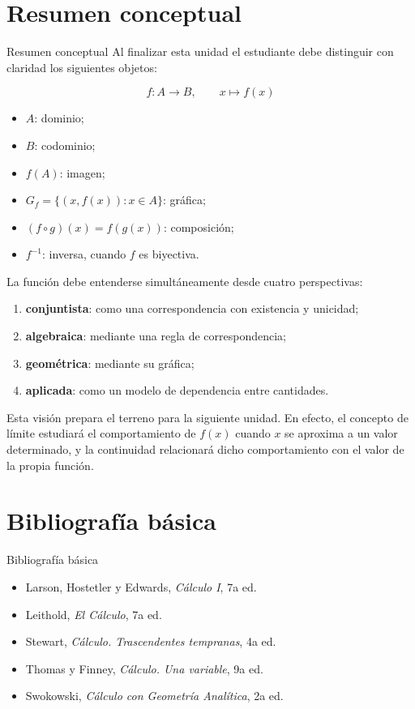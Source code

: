 \documentclass[aspectratio=169,10pt]{beamer}
\begin{document}
\section{Resumen conceptual}
\begin{frame}{Resumen conceptual}
Al finalizar esta unidad el estudiante debe distinguir con claridad los
siguientes objetos:

\[
\boxed{
f:A\to B,\qquad x\mapsto f(x)
}
\]

\begin{itemize}
    \item $A$: dominio;
    \item $B$: codominio;
    \item $f(A)$: imagen;
    \item $G_f=\{(x,f(x)):x\in A\}$: gráfica;
    \item $(f\circ g)(x)=f(g(x))$: composición;
    \item $f^{-1}$: inversa, cuando $f$ es biyectiva.
\end{itemize}

La función debe entenderse simultáneamente desde cuatro perspectivas:
\begin{enumerate}
    \item \textbf{conjuntista}: como una correspondencia con existencia y
    unicidad;
    \item \textbf{algebraica}: mediante una regla de correspondencia;
    \item \textbf{geométrica}: mediante su gráfica;
    \item \textbf{aplicada}: como un modelo de dependencia entre cantidades.
\end{enumerate}

Esta visión prepara el terreno para la siguiente unidad. En efecto, el concepto
de límite estudiará el comportamiento de $f(x)$ cuando $x$ se aproxima a un
valor determinado, y la continuidad relacionará dicho comportamiento con el
valor de la propia función.

\end{frame}
\section{Bibliografía básica}
\begin{frame}{Bibliografía básica}
\begin{itemize}
    \item Larson, Hostetler y Edwards, \emph{Cálculo I}, 7a ed.
    \item Leithold, \emph{El Cálculo}, 7a ed.
    \item Stewart, \emph{Cálculo. Trascendentes tempranas}, 4a ed.
    \item Thomas y Finney, \emph{Cálculo. Una variable}, 9a ed.
    \item Swokowski, \emph{Cálculo con Geometría Analítica}, 2a ed.
\end{itemize}
\end{frame}
\end{document}
